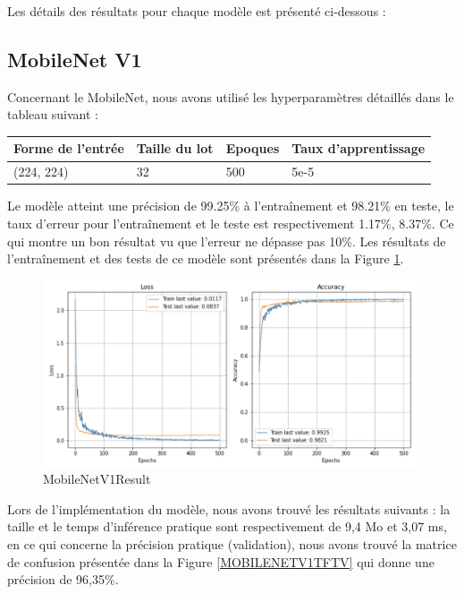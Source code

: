 Les détails des résultats pour chaque modèle est présenté ci-dessous : 
\newpage
\subsection{MobileNet V1 }
Concernant le MobileNet, nous avons utilisé les hyperparamètres détaillés dans le tableau suivant : 

    \begin{table}[h]
        \begin{center}
            \begin{tabular}{|l|l|l|l|}
                \hline
                Forme de l'entrée & Taille du lot & Epoques & Taux d'apprentissage \\ \hline
                (224, 224)        & 32            & 500     & 5e-5                 \\ \hline
                \end{tabular}
        \end{center}
        
        \end{table}
        Le modèle atteint une précision de 99.25\% à l'entraînement et 98.21\% en teste, le taux d’erreur pour l'entraînement et le teste est respectivement 1.17\%, 8.37\%. Ce qui montre un bon résultat vu que l’erreur ne dépasse pas 10\%. Les résultats de l'entraînement et des tests de ce modèle sont présentés dans la Figure \ref{MobileNetV1Result}. 
 \begin{figure}[h]
\centering
\includegraphics[width=13cm]{assets/PartTwo/ChapterTwo/MobileNetV1Result.png}
\caption{MobileNetV1Result}
\label{MobileNetV1Result}
\end{figure}

Lors de l'implémentation du modèle, nous avons trouvé les résultats suivants : la taille et le temps d'inférence pratique sont respectivement de 9,4 Mo et 3,07 ms, en ce qui concerne la précision pratique (validation), nous avons trouvé la matrice de confusion présentée dans la Figure \ref{MOBILENETV1TFTV} qui donne une précision de 96,35\%. 

